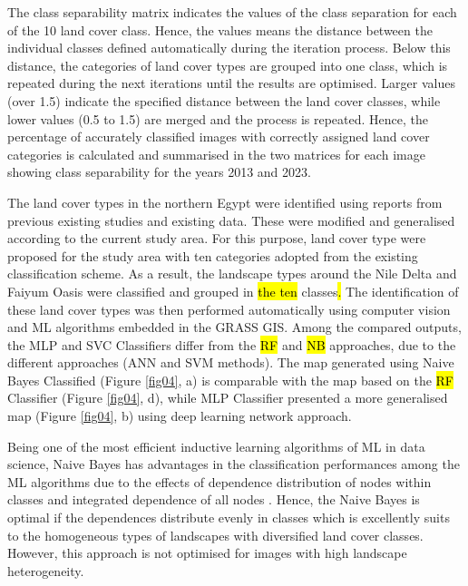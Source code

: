 \documentclass[final,5p,times,twocolumn]{elsarticle}
\numberwithin{table}{section}
\begin{document}
The class separability matrix indicates the values of the class separation for each of the 10 land cover class. Hence, the values means the distance between the individual classes defined automatically during the iteration process. Below this distance, the categories of land cover types are grouped into one class, which is repeated during the next iterations until the results are optimised. Larger values (over 1.5) indicate the specified distance between the land cover classes, while lower values (0.5 to 1.5) are merged  and the process is repeated. Hence, the percentage of accurately classified images with correctly assigned land cover categories is calculated and summarised in the two matrices for each image showing class separability for the years 2013 and 2023.

The land cover types in the northern Egypt were identified using reports from previous existing studies and existing data. These were modified and generalised according to the current study area. For this purpose, land cover type were proposed for the study area with ten categories adopted from the existing classification scheme. As a result, the landscape types around the Nile Delta and Faiyum Oasis were classified and grouped in \hl{the ten} classes\hl{. }The identification of these land cover types was then performed automatically using computer vision and ML algorithms embedded in the GRASS GIS. Among the compared outputs, the MLP and SVC Classifiers differ from the \hl{RF} and \hl{NB} approaches, due to the different approaches (ANN and SVM methods). The map generated using Naive Bayes Classified (Figure \ref{fig04}, a) is comparable with the map based on the \hl{RF} Classifier (Figure \ref{fig04}, d), while MLP Classifier presented a more generalised map (Figure \ref{fig04}, b) using deep learning network approach. 

Being one of the most efficient inductive learning algorithms of ML in data science, Naive Bayes has advantages in the classification performances among the ML algorithms due to the effects of dependence distribution of nodes within classes and integrated  dependence of all nodes \cite{Zhang2004TheOO}. Hence, the Naive Bayes is optimal if the dependences distribute evenly in classes which is excellently suits to the homogeneous types of landscapes with diversified land cover classes. However, this approach is not optimised for images with high landscape heterogeneity.
\end{document}

